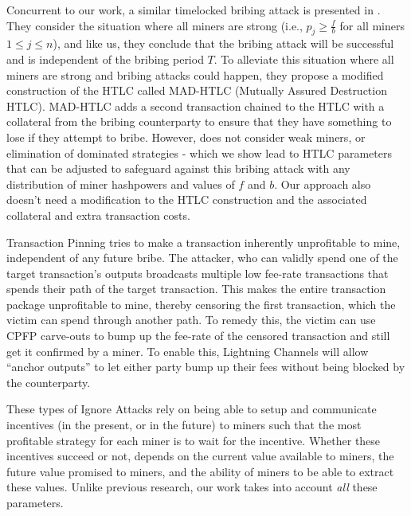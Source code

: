 \documentclass[runningheads]{llncs}
\begin{document}
Concurrent to our work, a similar timelocked bribing attack is presented in \cite{mad_htlc}. They consider the situation where all miners are strong (i.e., $p_j\geq \frac{f}{b}$ for all miners $1\leq j\leq n$), and like us, they conclude that the bribing attack will be successful and is independent of the bribing period $T$. To alleviate this situation where all miners are strong and bribing attacks could happen, they propose a modified construction of the HTLC called MAD-HTLC (Mutually Assured Destruction HTLC). MAD-HTLC adds a second transaction chained to the HTLC with a collateral from the bribing counterparty to ensure that they have something to lose if they attempt to bribe. However, \cite{mad_htlc} does not consider weak miners, or elimination of dominated strategies - which we show lead to HTLC parameters that can be adjusted to safeguard against this bribing attack with any distribution of miner hashpowers and values of $f$ and $b$. Our approach also doesn't need a modification to the HTLC construction and the associated collateral and extra transaction costs.

Transaction Pinning \cite{transaction_pinning} tries to make a transaction inherently unprofitable to mine, independent of any future bribe. The attacker, who can validly spend one of the target transaction's outputs broadcasts multiple low fee-rate transactions that spends their path of the target transaction. This makes the entire transaction package unprofitable to mine, thereby censoring the first transaction, which the victim can spend through another path. To remedy this, the victim can use CPFP carve-outs \cite{cpfp_carveout} to bump up the fee-rate of the censored transaction and still get it confirmed by a miner. To enable this, Lightning Channels will allow ``anchor outputs'' \cite{anchor_outputs} to let either party bump up their fees without being blocked by the counterparty.

These types of Ignore Attacks rely on being able to setup and communicate incentives (in the present, or in the future) to miners such that the most profitable strategy for each miner is to wait for the incentive. Whether these incentives succeed or not, depends on the current value available to miners, the future value promised to miners, and the ability of miners to be able to extract these values. Unlike previous research, our work takes into account \textit{all} these parameters.
\end{document}
